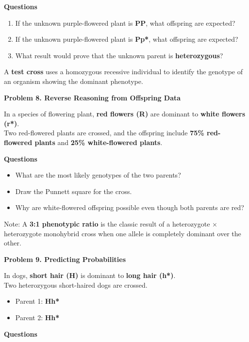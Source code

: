 \documentclass[
  letterpaper,
  DIV=11,
  numbers=noendperiod]{scrreprt}
\begin{document}
\textbf{Questions}

\begin{enumerate}
\def\labelenumi{\arabic{enumi}.}
\item
  If the unknown purple-flowered plant is \textbf{PP}, what offspring
  are expected?
\item
  If the unknown purple-flowered plant is \textbf{Pp*}, what offspring
  are expected?
\item
  What result would prove that the unknown parent is
  \textbf{heterozygous}?
\end{enumerate}

A \textbf{test cross} uses a homozygous recessive individual to identify
the genotype of an organism showing the dominant phenotype.

\textbf{Problem 8. Reverse Reasoning from Offspring Data}

In a species of flowering plant, \textbf{red flowers (R)} are dominant
to \textbf{white flowers (r*)}.\\
Two red-flowered plants are crossed, and the offspring include
\textbf{75\% red-flowered plants} and \textbf{25\% white-flowered
plants}.

\textbf{Questions}

\begin{itemize}
\item
  What are the most likely genotypes of the two parents?
\item
  Draw the Punnett square for the cross.
\item
  Why are white-flowered offspring possible even though both parents are
  red?
\end{itemize}

Note: A \textbf{3:1 phenotypic ratio} is the classic result of a
heterozygote × heterozygote monohybrid cross when one allele is
completely dominant over the other.

\textbf{Problem 9. Predicting Probabilities}

In dogs, \textbf{short hair (H)} is dominant to \textbf{long hair
(h*)}.\\
Two heterozygous short-haired dogs are crossed.

\begin{itemize}
\item
  Parent 1: \textbf{Hh*}
\item
  Parent 2: \textbf{Hh*}
\end{itemize}

\textbf{Questions}
\end{document}
